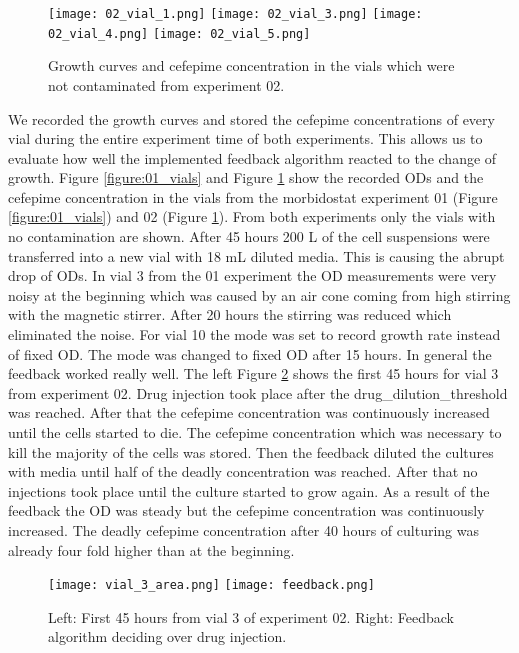 \begin{figure}[h]	
	\texttt{[image: 02\_vial\_1.png]}
	\texttt{[image: 02\_vial\_3.png]}
	\texttt{[image: 02\_vial\_4.png]}
	\texttt{[image: 02\_vial\_5.png]}	
	\caption{Growth curves and cefepime concentration in the vials which were not contaminated from experiment 02.}
	\label{figure:02_vials}
\end{figure}
We recorded the growth curves and stored the cefepime concentrations of every vial during the entire experiment time of both experiments. This allows us to evaluate how well the implemented feedback algorithm reacted to the change of growth. Figure \ref{figure:01_vials} and Figure \ref{figure:02_vials} show the recorded ODs and the cefepime concentration in the vials from the morbidostat experiment 01 (Figure \ref{figure:01_vials}) and 02 (Figure \ref{figure:02_vials}). From both experiments only the vials with no contamination are shown. After 45 hours 200 \textmu L of the cell suspensions were transferred into a new vial with 18 mL diluted media. This is causing the abrupt drop of ODs. In vial 3 from the 01 experiment the OD measurements were very noisy at the beginning which was caused by an air cone coming from high stirring with the magnetic stirrer. After 20 hours the stirring was reduced which eliminated the noise. For vial 10 the mode was set to record growth rate instead of fixed OD. The mode was changed to fixed OD after 15 hours. 
In general the feedback worked really well. The left Figure \ref{figure:vial_3_area} shows the first 45 hours for vial 3 from experiment 02. Drug injection took place after the drug\_dilution\_threshold was reached. After that the cefepime concentration was continuously increased until the cells started to die. The cefepime concentration which was necessary to kill the majority of the cells was stored. Then the feedback diluted the cultures with media until half of the deadly concentration was reached. After that no injections took place until the culture started to grow again. As a result of the feedback the OD was steady but the cefepime concentration was continuously increased. The deadly cefepime concentration after 40 hours of culturing was already four fold higher than at the beginning. 
\begin{figure}[H]
	\texttt{[image: vial\_3\_area.png]}
	\texttt{[image: feedback.png]}
	\caption{Left: First 45 hours from vial 3 of experiment 02. Right: Feedback algorithm deciding over drug injection.}
	\label{figure:vial_3_area}
\end{figure}

